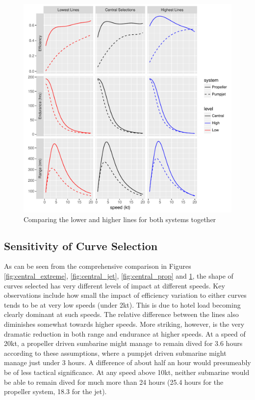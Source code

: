 \documentclass{article}\usepackage[]{graphicx}\usepackage[]{color}
\makeatletter
\def\maxwidth{ %
  \ifdim\Gin@nat@width>\linewidth
    \linewidth
  \else
    \Gin@nat@width
  \fi
}
\newenvironment{knitrout}{}{} %
\makeatother
\begin{document}
\begin{figure}
\begin{knitrout}
\color{fgcolor}

{\centering \includegraphics[width=\maxwidth]{figures/plots-plot_results4-1} 

}



\end{knitrout}
\caption{Comparing the lower and higher lines for both systems together}
\label{fig:bottom_top}
\end{figure}

\subsection{Sensitivity of Curve Selection}
As can be seen from the comprehensive comparison in Figures \ref{fig:central_extreme}, \ref{fig:central_jet}, \ref{fig:central_prop} and \ref{fig:bottom_top}, the shape of curves selected has very different levels of impact at different speeds.  Key observations include how small the impact of efficiency variation to either curves tends to be at very low speeds (under 2kt).  This is due to hotel load becoming clearly dominant at such speeds.  The relative difference between the lines also diminishes somewhat towards higher speeds.  More striking, however, is the very dramatic reduction in both range and endurance at higher speeds. At a speed of 20kt, a propeller driven sumbarine might manage to remain dived for 3.6 hours according to these assumptions, where a pumpjet driven submarine might manage just under 3 hours.  A difference of about half an hour would presumeably be of less tactical significance. At any speed above 10kt, neither submarine would be able to remain dived for much more than 24 hours (25.4 hours for the propeller system, 18.3 for the jet).
\end{document}
